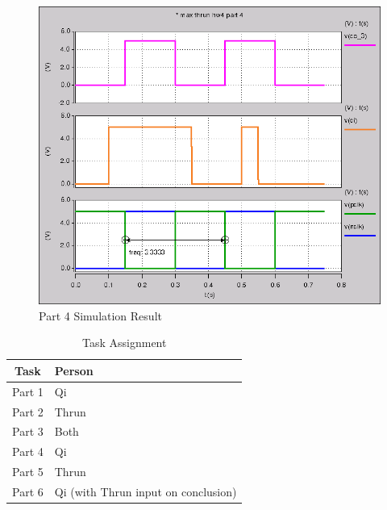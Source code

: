 \documentclass{article}
\begin{document}
\begin{figure}[H]
    \centering
    \includegraphics[width=\linewidth]{../part_4.png}
    \caption{Part 4 Simulation Result}
\end{figure}


\begin{table}[H]
    \centering
    \begin{tabular}{cl}
        \toprule
        \textbf{Task} & \textbf{Person}\\
        \midrule
        Part 1 & Qi \\
        Part 2 & Thrun \\
        Part 3 & Both \\
        Part 4 & Qi \\
        Part 5 & Thrun \\
        Part 6 & Qi (with Thrun input on conclusion)\\
        \bottomrule
    \end{tabular}
    \caption{Task Assignment}
\end{table}
\end{document}
